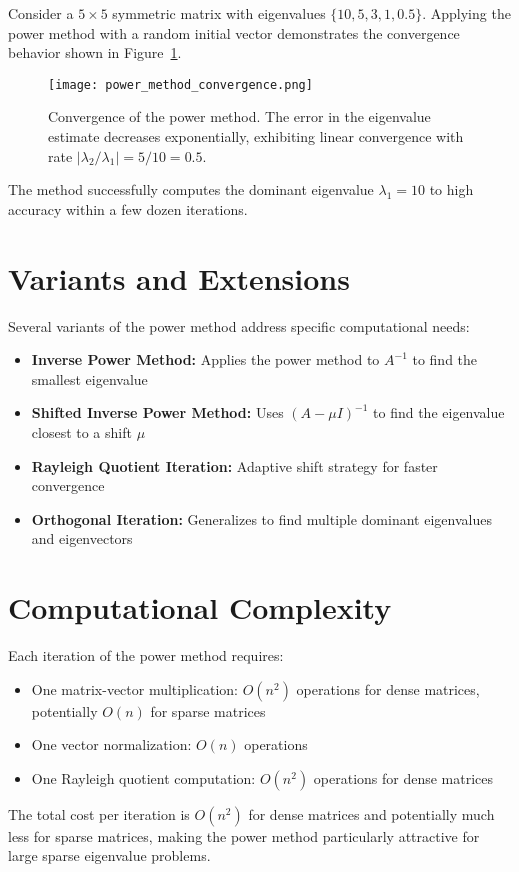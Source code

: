 \documentclass[11pt, a4paper]{article}
\begin{document}
Consider a $5 \times 5$ symmetric matrix with eigenvalues $\{10, 5, 3, 1, 0.5\}$. Applying the power method with a random initial vector demonstrates the convergence behavior shown in Figure~\ref{fig:convergence}.

\begin{figure}[h]
    \centering
    \texttt{[image: power\_method\_convergence.png]}
    \caption{Convergence of the power method. The error in the eigenvalue estimate decreases exponentially, exhibiting linear convergence with rate $|\lambda_2/\lambda_1| = 5/10 = 0.5$.}
    \label{fig:convergence}
\end{figure}

The method successfully computes the dominant eigenvalue $\lambda_1 = 10$ to high accuracy within a few dozen iterations.

\section{Variants and Extensions}

Several variants of the power method address specific computational needs:

\begin{itemize}
    \item \textbf{Inverse Power Method:} Applies the power method to $A^{-1}$ to find the smallest eigenvalue
    \item \textbf{Shifted Inverse Power Method:} Uses $(A - \mu I)^{-1}$ to find the eigenvalue closest to a shift $\mu$
    \item \textbf{Rayleigh Quotient Iteration:} Adaptive shift strategy for faster convergence
    \item \textbf{Orthogonal Iteration:} Generalizes to find multiple dominant eigenvalues and eigenvectors
\end{itemize}

\section{Computational Complexity}

Each iteration of the power method requires:
\begin{itemize}
    \item One matrix-vector multiplication: $O(n^2)$ operations for dense matrices, potentially $O(n)$ for sparse matrices
    \item One vector normalization: $O(n)$ operations
    \item One Rayleigh quotient computation: $O(n^2)$ operations for dense matrices
\end{itemize}

The total cost per iteration is $O(n^2)$ for dense matrices and potentially much less for sparse matrices, making the power method particularly attractive for large sparse eigenvalue problems.
\end{document}
